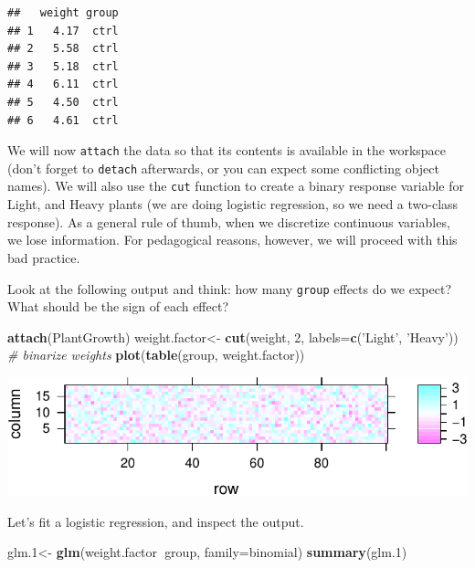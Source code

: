 \documentclass[]{book}
\newenvironment{Shaded}{\begin{snugshade}}{\end{snugshade}}
\newcommand{\KeywordTok}[1]{\textcolor[rgb]{0.13,0.29,0.53}{\textbf{#1}}}
\newcommand{\DataTypeTok}[1]{\textcolor[rgb]{0.13,0.29,0.53}{#1}}
\newcommand{\DecValTok}[1]{\textcolor[rgb]{0.00,0.00,0.81}{#1}}
\newcommand{\StringTok}[1]{\textcolor[rgb]{0.31,0.60,0.02}{#1}}
\newcommand{\CommentTok}[1]{\textcolor[rgb]{0.56,0.35,0.01}{\textit{#1}}}
\newcommand{\OperatorTok}[1]{\textcolor[rgb]{0.81,0.36,0.00}{\textbf{#1}}}
\newcommand{\NormalTok}[1]{#1}
\theoremstyle{definition}
\theoremstyle{definition}
\theoremstyle{definition}
\theoremstyle{remark}
\begin{document}
\begin{verbatim}
##   weight group
## 1   4.17  ctrl
## 2   5.58  ctrl
## 3   5.18  ctrl
## 4   6.11  ctrl
## 5   4.50  ctrl
## 6   4.61  ctrl
\end{verbatim}

We will now \texttt{attach} the data so that its contents is available
in the workspace (don't forget to \texttt{detach} afterwards, or you can
expect some conflicting object names). We will also use the \texttt{cut}
function to create a binary response variable for Light, and Heavy
plants (we are doing logistic regression, so we need a two-class
response). As a general rule of thumb, when we discretize continuous
variables, we lose information. For pedagogical reasons, however, we
will proceed with this bad practice.

Look at the following output and think: how many \texttt{group} effects
do we expect? What should be the sign of each effect?

\begin{Shaded}
\begin{Highlighting}[]
\KeywordTok{attach}\NormalTok{(PlantGrowth)}
\NormalTok{weight.factor<-}\StringTok{ }\KeywordTok{cut}\NormalTok{(weight, }\DecValTok{2}\NormalTok{, }\DataTypeTok{labels=}\KeywordTok{c}\NormalTok{(}\StringTok{'Light'}\NormalTok{, }\StringTok{'Heavy'}\NormalTok{)) }\CommentTok{# binarize weights}
\KeywordTok{plot}\NormalTok{(}\KeywordTok{table}\NormalTok{(group, weight.factor))}
\end{Highlighting}
\end{Shaded}

\includegraphics[width=0.5\linewidth]{Rcourse_files/figure-latex/unnamed-chunk-168-1}

Let's fit a logistic regression, and inspect the output.

\begin{Shaded}
\begin{Highlighting}[]
\NormalTok{glm.}\DecValTok{1}\NormalTok{<-}\StringTok{ }\KeywordTok{glm}\NormalTok{(weight.factor}\OperatorTok{~}\NormalTok{group, }\DataTypeTok{family=}\NormalTok{binomial)}
\KeywordTok{summary}\NormalTok{(glm.}\DecValTok{1}\NormalTok{)}
\end{Highlighting}
\end{Shaded}
\end{document}
